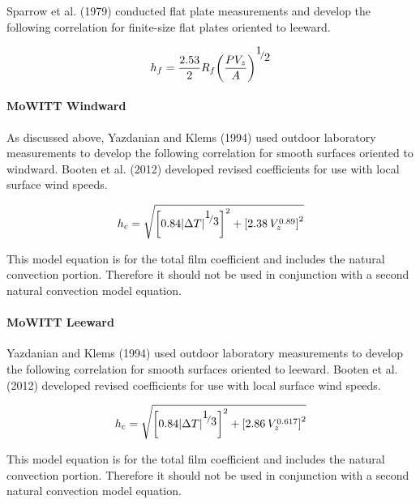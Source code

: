 Sparrow et al. (1979) conducted flat plate measurements and develop the following correlation for finite-size flat plates oriented to leeward.

\begin{equation}
{h_f} = \frac{{2.53}}{2}{R_f}{\left( {\frac{{P{V_z}}}{A}} \right)^{{\raise0.7ex\hbox{1} \!\mathord{\left/ {\vphantom {1 2}}\right.}\!\lower0.7ex\hbox{2}}}}
\end{equation}

\paragraph{MoWITT Windward}\label{mowitt-windward}

As discussed above, Yazdanian and Klems (1994) used outdoor laboratory measurements to develop the following correlation for smooth surfaces oriented to windward. Booten et al. (2012) developed revised coefficients for use with local surface wind speeds.

\begin{equation}
{h_c} = \sqrt {{{\left[ {0.84{{\left| {\Delta T} \right|}^{{\raise0.7ex\hbox{1} \!\mathord{\left/ {\vphantom {1 3}}\right.}\!\lower0.7ex\hbox{3}}}}} \right]}^2} + {{\left[ {2.38{\kern 1pt} {\kern 1pt} V_z^{0.89}} \right]}^2}}
\end{equation}

This model equation is for the total film coefficient and includes the natural convection portion. Therefore it should not be used in conjunction with a second natural convection model equation.

\paragraph{MoWITT Leeward}\label{mowitt-leeward}

Yazdanian and Klems (1994) used outdoor laboratory measurements to develop the following correlation for smooth surfaces oriented to leeward. Booten et al. (2012) developed revised coefficients for use with local surface wind speeds.

\begin{equation}
{h_c} = \sqrt {{{\left[ {0.84{{\left| {\Delta T} \right|}^{{\raise0.7ex\hbox{1} \!\mathord{\left/ {\vphantom {1 3}}\right.}\!\lower0.7ex\hbox{3}}}}} \right]}^2} + {{\left[ {2.86{\kern 1pt} {\kern 1pt} V_z^{0.617}} \right]}^2}}
\end{equation}

This model equation is for the total film coefficient and includes the natural convection portion. Therefore it should not be used in conjunction with a second natural convection model equation.

